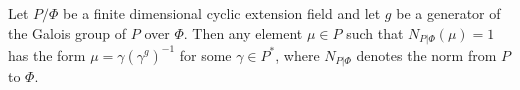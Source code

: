 Let $P/\Phi$ be a finite dimensional cyclic extension field and let $g$ be a generator of the Galois group of $P$ over $\Phi$. Then any element $\mu \in P$ such that $N_{P|\Phi}(\mu) = 1$ has the form $\mu = \gamma(\gamma^g)^{-1}$ for some $\gamma \in P^*$, where $N_{P|\Phi}$ denotes the norm from $P$ to $\Phi$.
